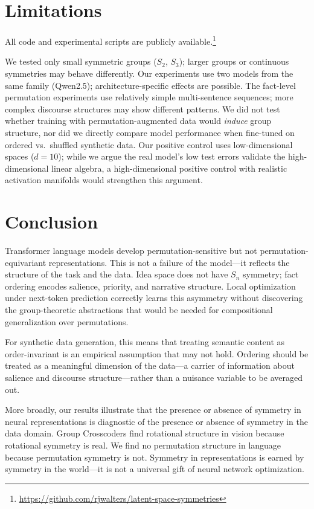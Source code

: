 \documentclass[10pt, letterpaper]{article}
\begin{document}
\section{Limitations}
\label{sec:limitations}

All code and experimental scripts are publicly available.\footnote{\url{https://github.com/rjwalters/latent-space-symmetries}}

We tested only small symmetric groups ($S_2$, $S_3$); larger groups or continuous symmetries may behave differently. Our experiments use two models from the same family (Qwen2.5); architecture-specific effects are possible. The fact-level permutation experiments use relatively simple multi-sentence sequences; more complex discourse structures may show different patterns. We did not test whether training with permutation-augmented data would \emph{induce} group structure, nor did we directly compare model performance when fine-tuned on ordered vs.\ shuffled synthetic data. Our positive control uses low-dimensional spaces ($d = 10$); while we argue the real model's low test errors validate the high-dimensional linear algebra, a high-dimensional positive control with realistic activation manifolds would strengthen this argument.

\section{Conclusion}
\label{sec:conclusion}

Transformer language models develop permutation-sensitive but not permutation-equivariant representations. This is not a failure of the model---it reflects the structure of the task and the data. Idea space does not have $S_n$ symmetry; fact ordering encodes salience, priority, and narrative structure. Local optimization under next-token prediction correctly learns this asymmetry without discovering the group-theoretic abstractions that would be needed for compositional generalization over permutations.

For synthetic data generation, this means that treating semantic content as order-invariant is an empirical assumption that may not hold. Ordering should be treated as a meaningful dimension of the data---a carrier of information about salience and discourse structure---rather than a nuisance variable to be averaged out.

More broadly, our results illustrate that the presence or absence of symmetry in neural representations is diagnostic of the presence or absence of symmetry in the data domain. Group Crosscoders find rotational structure in vision because rotational symmetry is real. We find no permutation structure in language because permutation symmetry is not. Symmetry in representations is earned by symmetry in the world---it is not a universal gift of neural network optimization.
\end{document}
